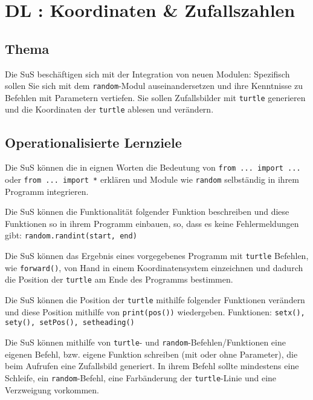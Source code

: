 \section{DL \themycounter: Koordinaten \& Zufallszahlen}
\begin{myExBox}[title=DL \themycounter]
\subsection*{Thema}
Die SuS beschäftigen sich mit der Integration von neuen Modulen: Spezifisch sollen Sie sich mit dem \lstinline|random|-Modul auseinandersetzen und ihre Kenntnisse zu Befehlen mit Parametern vertiefen. Sie sollen Zufallsbilder mit \lstinline|turtle| generieren und die Koordinaten der \lstinline|turtle| ablesen und verändern.


\subsection*{Operationalisierte Lernziele}
\begin{todolist}
    \item Die SuS können die in eignen Worten die Bedeutung von \lstinline|from ... import ...| oder \lstinline|from ... import *| erklären und Module wie \lstinline|random| selbständig in ihrem Programm integrieren.
    \item Die SuS können die Funktionalität folgender Funktion beschreiben und diese Funktionen so in ihrem Programm einbauen, so, dass es keine Fehlermeldungen gibt: \lstinline|random.randint(start, end)|
    \item Die SuS können das Ergebnis eines vorgegebenes Programm mit \lstinline|turtle| Befehlen, wie \lstinline|forward()|, von Hand in einem Koordinatensystem einzeichnen und dadurch die Position der \lstinline|turtle| am Ende des Programms bestimmen.
    \item Die SuS können die Position der \lstinline|turtle| mithilfe folgender Funktionen verändern und diese Position mithilfe von \lstinline|print(pos())| wiedergeben. Funktionen: \lstinline|setx(), sety(), setPos(), setheading() | 
    \item Die SuS können mithilfe von \lstinline|turtle|- und \lstinline|random|-Befehlen/Funktionen eine eigenen Befehl, bzw. eigene Funktion schreiben (mit oder ohne Parameter), die beim Aufrufen eine Zufallsbild generiert. In ihrem Befehl sollte mindestens eine Schleife, ein \lstinline|random|-Befehl, eine Farbänderung der \lstinline|turtle|-Linie und eine Verzweigung vorkommen.
\end{todolist}


\end{myExBox}
